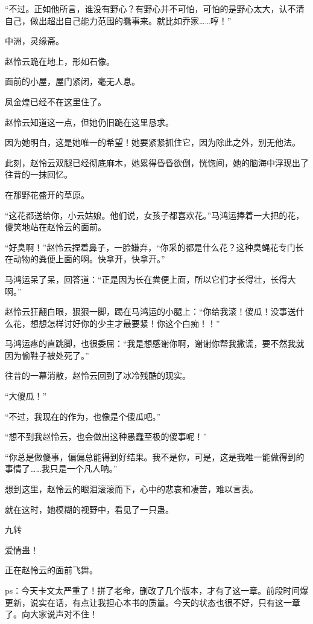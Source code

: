 \begin{this_body}
“不过。正如他所言，谁没有野心？有野心并不可怕，可怕的是野心太大，认不清自己，做出超出自己能力范围的蠢事来。就比如乔家……哼！”

中洲，灵缘斋。

赵怜云跪在地上，形如石像。

面前的小屋，屋门紧闭，毫无人息。

凤金煌已经不在这里住了。

赵怜云知道这一点，但她仍旧跪在这里恳求。

因为她明白，这是她唯一的希望！她要紧紧抓住它，因为除此之外，别无他法。

此刻，赵怜云双腿已经彻底麻木，她累得昏昏欲倒，恍惚间，她的脑海中浮现出了往昔的一抹回忆。

在那野花盛开的草原。

“这花都送给你，小云姑娘。他们说，女孩子都喜欢花。”马鸿运捧着一大把的花，傻笑地站在赵怜云的面前。

“好臭啊！”赵怜云捏着鼻子，一脸嫌弃，“你采的都是什么花？这种臭蝇花专门长在动物的粪便上面的啊。快拿开，快拿开。”

马鸿运呆了呆，回答道：“正是因为长在粪便上面，所以它们才长得壮，长得大啊。”

赵怜云狂翻白眼，狠狠一脚，踢在马鸿运的小腿上：“你给我滚！傻瓜！没事送什么花，想想怎样讨好你的少主才最要紧！你这个白痴！！”

马鸿运疼的直跳脚，也很委屈：“我是想感谢你啊，谢谢你帮我撒谎，要不然我就因为偷鞋子被处死了。”

往昔的一幕消散，赵怜云回到了冰冷残酷的现实。

“大傻瓜！”

“不过，我现在的作为，也像是个傻瓜吧。”

“想不到我赵怜云，也会做出这种愚蠢至极的傻事呢！”

“你总是做傻事，偏偏总能得到好结果。我不是你，可是，这是我唯一能做得到的事情了……我只是一个凡人呐。”

想到这里，赵怜云的眼泪滚滚而下，心中的悲哀和凄苦，难以言表。

就在这时，她模糊的视野中，看见了一只蛊。

九转

爱情蛊！

正在赵怜云的面前飞舞。

ps：今天卡文太严重了！拼了老命，删改了几个版本，才有了这一章。前段时间爆更新，说实在话，有点让我担心本书的质量。今天的状态也很不好，只有这一章了。向大家说声对不住！

\end{this_body}

